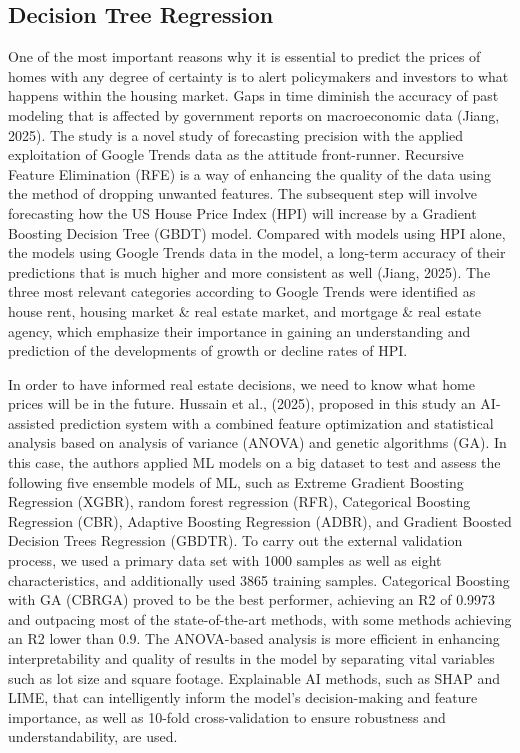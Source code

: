 \documentclass[12pt, a4paper, oneside]{book}
\begin{document}
\subsection{Decision Tree Regression}

One of the most important reasons why it is essential to predict the prices of homes with any degree of certainty is to alert policymakers and investors to what happens within the housing market. Gaps in time diminish the accuracy of past modeling that is affected by government reports on macroeconomic data (Jiang, 2025). The study is a novel study of forecasting precision with the applied exploitation of Google Trends data as the attitude front-runner. Recursive Feature Elimination (RFE) is a way of enhancing the quality of the data using the method of dropping unwanted features. The subsequent step will involve forecasting how the US House Price Index (HPI) will increase by a Gradient Boosting Decision Tree (GBDT) model. Compared with models using HPI alone, the models using Google Trends data in the model, a long-term accuracy of their predictions that is much higher and more consistent as well (Jiang, 2025). The three most relevant categories according to Google Trends were identified as house rent, housing market \& real estate market, and mortgage \& real estate agency, which emphasize their importance in gaining an understanding and prediction of the developments of growth or decline rates of HPI.


In order to have informed real estate decisions, we need to know what home prices will be in the future. Hussain et al., (2025), proposed in this study an AI-assisted prediction system with a combined feature optimization and statistical analysis based on analysis of variance (ANOVA) and genetic algorithms (GA). In this case, the authors applied ML models on a big dataset to test and assess the following five ensemble models of ML, such as Extreme Gradient Boosting Regression (XGBR), random forest regression (RFR), Categorical Boosting Regression (CBR), Adaptive Boosting Regression (ADBR), and Gradient Boosted Decision Trees Regression (GBDTR). To carry out the external validation process, we used a primary data set with 1000 samples as well as eight characteristics, and additionally used 3865 training samples. Categorical Boosting with GA (CBRGA) proved to be the best performer, achieving an R2 of 0.9973 and outpacing most of the state-of-the-art methods, with some methods achieving an R2 lower than 0.9. The ANOVA-based analysis is more efficient in enhancing interpretability and quality of results in the model by separating vital variables such as lot size and square footage. Explainable AI methods, such as SHAP and LIME, that can intelligently inform the model's decision-making and feature importance, as well as 10-fold cross-validation to ensure robustness and understandability, are used.
\end{document}
